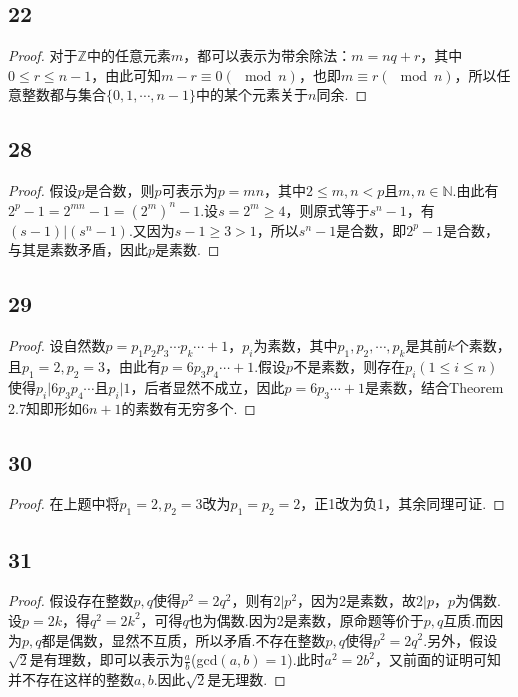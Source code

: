 \documentclass[twocolumn]{article}
\newenvironment{SChinese}{
	\CJKfamily{gbsn}
	\CJKtilde
	\CJKnospace}{}
\begin{document}
\begin{CJK}{UTF8}{}
\begin{SChinese}
				\subsection*{22}
					\begin{proof}
						对于$\mathbb{Z}$中的任意元素$m$，都可以表示为带余除法：$m=nq+r$，其中$0\le r\le n-1$，由此可知$m-r\equiv0(\mod n)$，也即$m\equiv r(\mod n)$，所以任意整数都与集合$\{0,1,\cdots,n-1\}$中的某个元素关于$n$同余.
					\end{proof}
				\subsection*{28}
					\begin{proof}
						假设$p$是合数，则$p$可表示为$p=mn$，其中$2\le m,n<p$且$m,n\in\mathbb{N}$.由此有$2^p-1=2^{mn}-1=(2^m)^n-1$.设$s=2^m\ge4$，则原式等于$s^n-1$，有$(s-1)|(s^n-1)$.又因为$s-1\ge3>1$，所以$s^n-1$是合数，即$2^p-1$是合数，与其是素数矛盾，因此$p$是素数.
					\end{proof}
				\subsection*{29}
					\begin{proof}
						设自然数$p=p_1p_2p_3\cdots p_k\cdots+1$，$p_i$为素数，其中$p_1,p_2,\cdots,p_k$是其前$k$个素数，且$p_1=2,p_2=3$，由此有$p=6p_3p_4\cdots+1$.假设$p$不是素数，则存在$p_i(1\le i\le n)$使得$p_i|6p_3p_4\cdots$且$p_i|1$，后者显然不成立，因此$p=6p_3\cdots+1$是素数，结合Theorem 2.7知即形如$6n+1$的素数有无穷多个.
					\end{proof}
				\subsection*{30}
					\begin{proof}
						在上题中将$p_1=2,p_2=3$改为$p_1=p_2=2$，正1改为负1，其余同理可证.
					\end{proof}
				\subsection*{31}
					\begin{proof}
						假设存在整数$p,q$使得$p^2=2q^2$，则有$2|p^2$，因为2是素数，故$2|p$，$p$为偶数.设$p=2k$，得$q^2=2k^2$，可得$q$也为偶数.因为2是素数，原命题等价于$p,q$互质.而因为$p,q$都是偶数，显然不互质，所以矛盾.不存在整数$p,q$使得$p^2=2q^2$.另外，假设$\sqrt{2}$是有理数，即可以表示为$\frac{a}{b}$(gcd$(a,b)=1$).此时$a^2=2b^2$，又前面的证明可知并不存在这样的整数$a,b$.因此$\sqrt{2}$是无理数.
					\end{proof}

\end{SChinese}
\end{CJK}
\end{document}
